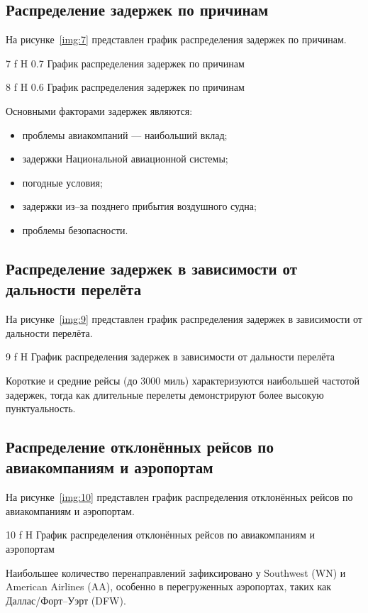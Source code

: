 \subsection{Распределение задержек по причинам}

На рисунке~\ref{img:7} представлен график распределения задержек по причинам.

{7}
{f}
{H}
{0.7\textwidth}
{График распределения задержек по причинам}

{8}
{f}
{H}
{0.6\textwidth}
{График распределения задержек по причинам}

Основными факторами задержек являются:
\begin{itemize}[label=---]
    \item проблемы авиакомпаний --- наибольший вклад;
    \item задержки Национальной авиационной системы;
    \item погодные условия;
    \item задержки из--за позднего прибытия воздушного судна;
    \item проблемы безопасности.
\end{itemize}


\subsection{Распределение задержек в зависимости от дальности перелёта}

На рисунке~\ref{img:9} представлен график распределения задержек в зависимости от дальности перелёта.

{9}
{f}
{H}
{\textwidth}
{График распределения задержек в зависимости от дальности перелёта}

Короткие и средние рейсы (до 3000 миль) характеризуются наибольшей частотой задержек, тогда как длительные перелеты демонстрируют более высокую пунктуальность.

\subsection{Распределение отклонённых рейсов по авиакомпаниям и аэропортам}

На рисунке~\ref{img:10} представлен график распределения отклонённых рейсов по авиакомпаниям и аэропортам.

{10}
{f}
{H}
{\textwidth}
{График распределения отклонённых рейсов по авиакомпаниям и аэропортам}

Наибольшее количество перенаправлений зафиксировано у Southwest (WN) и American Airlines (AA), особенно в перегруженных аэропортах, таких как Даллас/Форт--Уэрт (DFW).

